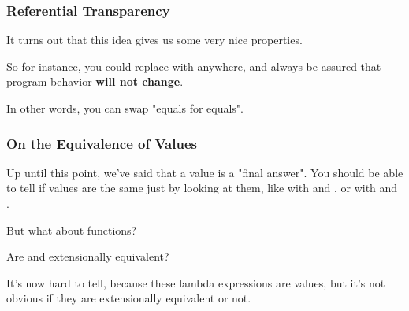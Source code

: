 \documentclass[aspectratio=169]{beamer}
\begin{document}
\begin{frame}[fragile]
  \frametitle{Referential Transparency}

  It turns out that this idea gives us some very nice properties.

  \vspace{\fill}

  \vspace{\fill}

  So for instance, you could replace  with  anywhere, and always
  be assured that program behavior \textbf{will not change}.
  
  \vspace{5pt}

  In other words, you can swap "equals for equals".

  \vspace{\fill}

\end{frame}

\begin{frame}[fragile]
  \frametitle{On the Equivalence of Values}

  Up until this point, we've said that a value is a "final answer". You should be able
  to tell if values are the same just by looking at them, like with  and ,
  or with  and .

  \vspace{\fill}

  But what about functions?

  \vspace{5pt}

  Are  and  extensionally equivalent?

  \vspace{\fill}

  It's now hard to tell, because these lambda expressions are values, but it's not obvious 
  if they are extensionally equivalent or not.
\end{frame}
\end{document}
